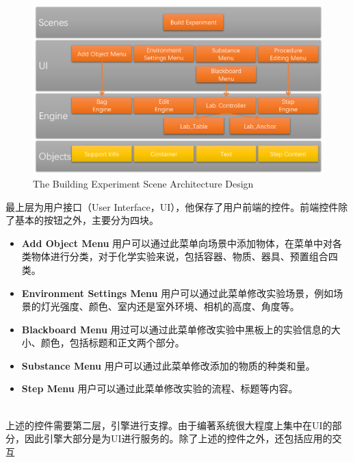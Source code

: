\begin{figure}[!htp]
  \centering
  \includegraphics[width=12cm]{figure/buildearc.png}
    {The Building Experiment Scene Architecture Design}
 \label{fig:gm}
\end{figure}

最上层为用户接口（User Interface，UI），他保存了用户前端的控件。前端控件除了基本的按钮之外，主要分为四块。

\begin{itemize}
    \item \textbf{Add Object Menu}
用户可以通过此菜单向场景中添加物体，在菜单中对各类物体进行分类，对于化学实验来说，包括容器、物质、器具、预置组合四类。
    
    \item \textbf{Environment Settings Menu}
用户可以通过此菜单修改实验场景，例如场景的灯光强度、颜色、室内还是室外环境、相机的高度、角度等。
    
    \item \textbf{Blackboard Menu}
用过可以通过此菜单修改实验中黑板上的实验信息的大小、颜色，包括标题和正文两个部分。

    \item \textbf{Substance Menu}
用户可以通过此菜单修改添加的物质的种类和量。

    \item \textbf{Step Menu}
用户可以通过此菜单修改实验的流程、标题等内容。
\end{itemize}
~\\
\indent    	上述的控件需要第二层，引擎进行支撑。由于编著系统很大程度上集中在UI的部分，因此引擎大部分是为UI进行服务的。除了上述的控件之外，还包括应用的交互

